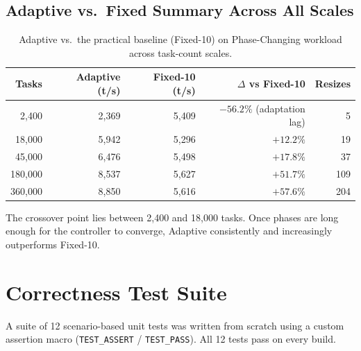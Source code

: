 \documentclass[12pt,a4paper]{article}
\begin{document}
\subsection{Adaptive vs.\ Fixed Summary Across All Scales}

\begin{table}[H]
\centering
\caption{Adaptive vs.\ the practical baseline (Fixed-10) on
         Phase-Changing workload across task-count scales.}
\begin{tabular}{rrrrr}
\toprule
\textbf{Tasks} & \textbf{Adaptive (t/s)} & \textbf{Fixed-10 (t/s)}
  & \textbf{$\Delta$ vs Fixed-10} & \textbf{Resizes} \\
\midrule
  2,400 &  2,369 & 5,409 & $-56.2\%$ (adaptation lag) &   5 \\
 18,000 &  5,942 & 5,296 & $+12.2\%$                  &  19 \\
 45,000 &  6,476 & 5,498 & $+17.8\%$                  &  37 \\
180,000 &  8,537 & 5,627 & $+51.7\%$                  & 109 \\
360,000 &  8,850 & 5,616 & $+57.6\%$                  & 204 \\
\bottomrule
\end{tabular}
\label{tab:summary}
\end{table}

The crossover point lies between 2,400 and 18,000 tasks.
Once phases are long enough for the controller to converge, Adaptive
consistently and increasingly outperforms Fixed-10.

\section{Correctness Test Suite}

A suite of 12 scenario-based unit tests was written from scratch using a
custom assertion macro (\texttt{TEST\_ASSERT} / \texttt{TEST\_PASS}).
All 12 tests pass on every build.
\end{document}
